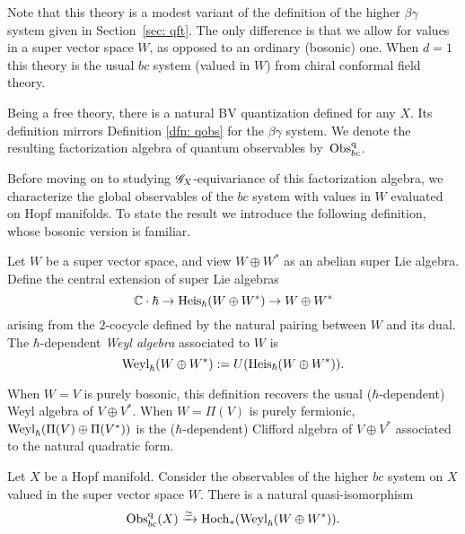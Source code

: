 \begin{rmk}
Note that this theory is a modest variant of the definition of the higher $\beta\gamma$ system given in Section~\ref{sec: qft}. 
The only difference is that we allow for values in a super vector space $W$, as opposed to an ordinary (bosonic) one. 
When $d=1$ this theory is the usual $bc$ system (valued in $W$) from chiral conformal field theory.
\end{rmk}

Being a free theory, there is a natural BV quantization defined for any $X$.
Its definition mirrors Definition \ref{dfn: qobs} for the $\beta\gamma$ system. 
We denote the resulting factorization algebra of quantum observables by~${\rm Obs}^{\rm q}_{bc}$. 

Before moving on to studying $\mathscr G_X$-equivariance of this factorization algebra, we characterize the global observables of the $bc$ system with values in $W$ evaluated on Hopf manifolds. 
To state the result we introduce the following definition, whose bosonic version is familiar. 

\begin{dfn}
Let $W$ be a super vector space, and view $W \oplus W^*$ as an abelian super Lie algebra. 
Define the central extension of super Lie algebras
\[
\mathbb C \cdot \hbar \to {\rm Heis}_\hbar (W \oplus W^*) \to W \oplus W^*
\]
arising from the $2$-cocycle defined by the natural pairing between $W$ and its dual. 
The $\hbar$-dependent {\em Weyl algebra} associated to $W$ is
\[
{\rm Weyl}_\hbar(W \oplus W^*) := U({\rm Heis}_\hbar(W \oplus W^*)) .
\]
\end{dfn}

\begin{rmk}
When $W = V$ is purely bosonic, this definition recovers the usual ($\hbar$-dependent) Weyl algebra of $V \oplus V^*$. 
When $W = \Pi(V)$ is purely fermionic, ${\rm Weyl}_\hbar(\Pi(V) \oplus \Pi(V^*))$ is the ($\hbar$-dependent) Clifford algebra of $V\oplus V^*$ associated to the natural quadratic form.  
\end{rmk} 

\begin{lem}\label{lem: hopfcliff}
Let $X$ be a Hopf manifold. 
Consider the observables of the higher $bc$ system on $X$ valued in the super vector space $W$. 
There is a natural quasi-isomorphism
\[
{\rm Obs}^{\rm q}_{bc}(X) \xrightarrow{\simeq} {\rm Hoch}_*({\rm Weyl}_\hbar(W \oplus W^*)) .
\]
\end{lem}

